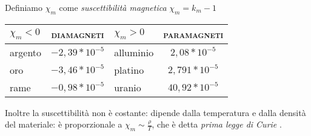 \begin{examplewt}
	Definiamo $\chi_m$ come \textit{suscettibilità magnetica} $\chi_m=k_m-1$
	\begin{center}
	\begin{tabular}{l|c|l|c}
		$\chi_m<0$ & \textsc{diamagneti} & $\chi_m>0$ & \textsc{paramagneti}\\
		\hline
		argento & $-2,39*10^{-5}$ & alluminio & $2,08*10^{-5}$\\
		oro & $-3,46*10^{-5}$ & platino & $2,791*10^{-5}$\\
		rame & $-0,98*10^{-5}$ & uranio & $40,92*10^{-5}$
	\end{tabular}
	\end{center}
	Inoltre la suscettibilità non è costante: dipende dalla temperatura e dalla densità del materiale: è proporzionale a $\chi_m\sim \frac{\rho}{T}$, che è detta \textit{prima legge di Curie} .
\end{examplewt}
%
%
